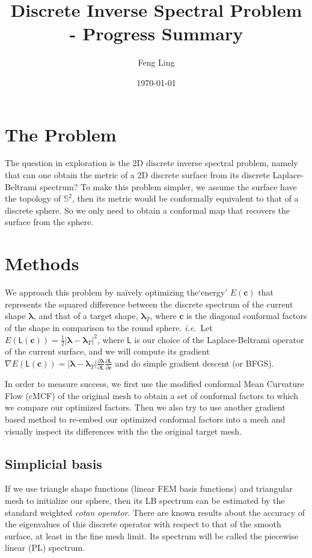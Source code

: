 \documentclass[11pt]{article}
\title{Discrete Inverse Spectral Problem - Progress Summary}
\author{Feng Ling}
\date{\monthyear\today}
\theoremstyle{definition}
\def\pp#1#2{{\frac{\partial #1}{\partial #2}}}
\def\f#1#2{{\frac{#1}{#2}}}
\def\mat#1{\mathsf{#1}}
\def\vect#1{\boldsymbol{\mathbf{#1}}}
\def\grad{\nabla}
\begin{document}
\maketitle
\thispagestyle{empty}

\section{The Problem}
The question in exploration is the 2D discrete inverse spectral problem, namely that can one obtain the metric of a 2D discrete surface from its discrete Laplace-Beltrami spectrum? To make this problem simpler, we assume the surface have the topology of $\mathbb S^2$, then its metric would be conformally equivalent to that of a discrete sphere. So we only need to obtain a conformal map that recovers the surface from the sphere.

\section{Methods}
We approach this problem by na\"ively optimizing the`energy' $E(\vect{c})$ that represents the squared difference between the discrete spectrum of the current shape $\vect{\lambda}$, and that of a target shape, $\vect{\lambda}_{T}$, where $\vect{c}$ is the diagonal conformal factors of the shape in comparison to the round sphere. \textit{i.e.}~Let $E(\mat{L}(\vect{c}))=\f12|\vect{\lambda}-\vect{\lambda}_{T}|^2$, where $\mat L$ is our choice of the Laplace-Beltrami operator of the current surface, and we will compute its gradient $\grad E(\mat{L}(\vect{c})) = |\vect{\lambda}-\vect{\lambda}_{T}|\pp{\vect\lambda}{\mat{L}}\pp{\mat{L}}{\vect{c}}$ and do simple gradient descent (or BFGS).

In order to measure success, we first use the modified conformal Mean Curvature Flow (cMCF) of the original mesh to obtain a set of conformal factors to which we compare our optimized factors. Then we also try to use another gradient based method to re-embed our optimized conformal factors into a mesh and visually inspect its differences with the the original target mesh.

\subsection{Simplicial basis}

If we use triangle shape functions (linear FEM basis functions) and triangular mesh to initialize our sphere, then its LB spectrum can be estimated by the standard weighted \textit{cotan operator}.
There are known results about the accuracy of the eigenvalues of this discrete operator with respect to that of the smooth surface, at least in the fine mesh limit.
Its spectrum will be called the piecewise linear (PL) spectrum.
\end{document}
